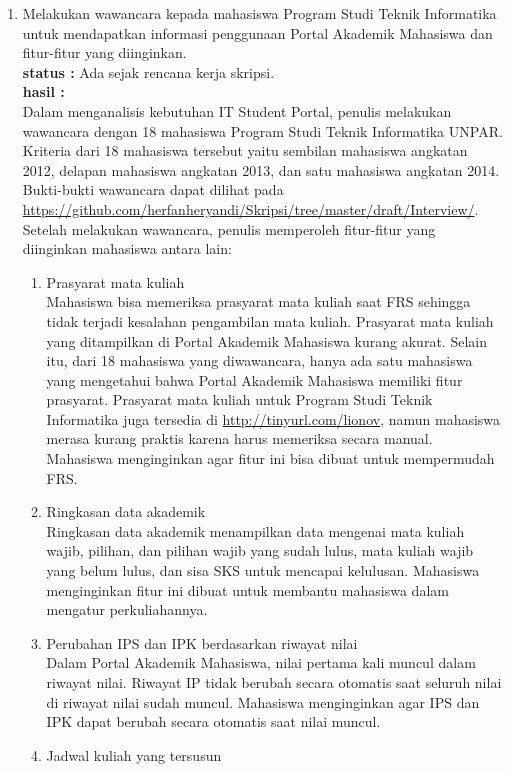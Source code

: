 \documentclass[a4paper,twoside]{article}
\begin{document}
\begin{enumerate}
		
		\item Melakukan wawancara kepada mahasiswa Program Studi Teknik Informatika untuk mendapatkan informasi
penggunaan Portal Akademik Mahasiswa dan fitur-fitur yang diinginkan.\\
		{\bf status :} Ada sejak rencana kerja skripsi.\\
		{\bf hasil :}  \\
		Dalam menganalisis kebutuhan IT Student Portal, penulis melakukan wawancara dengan 18 mahasiswa Program Studi Teknik Informatika UNPAR. Kriteria dari 18 mahasiswa tersebut yaitu sembilan mahasiswa angkatan 2012, delapan mahasiswa angkatan 2013, dan satu mahasiswa angkatan 2014. Bukti-bukti wawancara dapat dilihat pada \url{https://github.com/herfanheryandi/Skripsi/tree/master/draft/Interview/}. Setelah melakukan wawancara, penulis memperoleh fitur-fitur yang diinginkan mahasiswa antara lain:
\begin{enumerate}
	\item Prasyarat mata kuliah\\
	Mahasiswa bisa memeriksa prasyarat mata kuliah saat FRS sehingga tidak terjadi kesalahan pengambilan mata kuliah. Prasyarat mata kuliah yang ditampilkan di Portal Akademik Mahasiswa kurang akurat. Selain itu, dari 18 mahasiswa yang diwawancara, hanya ada satu mahasiswa yang mengetahui bahwa Portal Akademik Mahasiswa memiliki fitur prasyarat. Prasyarat mata kuliah untuk Program Studi Teknik Informatika juga tersedia di \url{http://tinyurl.com/lionov}, namun mahasiswa merasa kurang praktis karena harus memeriksa secara manual. Mahasiswa menginginkan agar fitur ini bisa dibuat untuk mempermudah FRS.
	\item Ringkasan data akademik\\
	Ringkasan data akademik menampilkan data mengenai mata kuliah wajib, pilihan, dan pilihan wajib yang sudah lulus, mata kuliah wajib yang belum lulus, dan sisa SKS untuk mencapai kelulusan. Mahasiswa menginginkan fitur ini dibuat untuk membantu mahasiswa dalam mengatur perkuliahannya.
	\item Perubahan IPS dan IPK berdasarkan riwayat nilai\\
	Dalam Portal Akademik Mahasiswa, nilai pertama kali muncul dalam riwayat nilai. Riwayat IP tidak berubah secara otomatis saat seluruh nilai di riwayat nilai sudah muncul. Mahasiswa menginginkan agar IPS dan IPK dapat berubah secara otomatis saat nilai muncul.
	\item Jadwal kuliah yang tersusun\\

\end{enumerate}
\end{enumerate}
\end{document}
